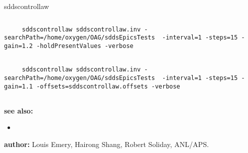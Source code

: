 \begin{sddsprog}{sddscontrollaw}
\begin{verbatim}
\end{verbatim}

      \begin{verbatim}
     sddscontrollaw sddscontrollaw.inv -searchPath=/home/oxygen/OAG/sddsEpicsTests  -interval=1 -steps=15 -gain=1.2 -holdPresentValues -verbose
      
\end{verbatim}

     \begin{verbatim}
     sddscontrollaw sddscontrollaw.inv -searchPath=/home/oxygen/OAG/sddsEpicsTests  -interval=1 -steps=15 -gain=1.1 -offsets=sddscontrollaw.offsets -verbose
     
\end{verbatim}

\item \textbf{see also:}

\begin{itemize}
  \item {}
\end{itemize}
\item \textbf{author:} Louis Emery, Hairong Shang, Robert Soliday, ANL/APS.
\end{sddsprog}
